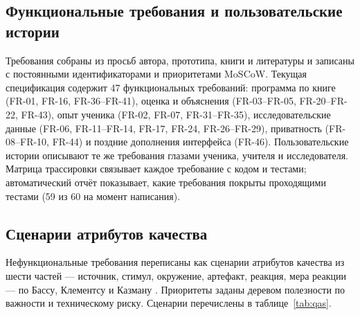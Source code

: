\subsection{Функциональные требования и пользовательские истории}

Требования собраны из просьб автора, прототипа, книги и литературы и записаны с постоянными
идентификаторами и приоритетами MoSCoW. Текущая спецификация содержит 47 функциональных требований:
программа по книге (FR-01, FR-16, FR-36--FR-41), оценка и объяснения (FR-03--FR-05, FR-20--FR-22, FR-43),
опыт ученика (FR-02, FR-07, FR-31--FR-35), исследовательские данные (FR-06, FR-11--FR-14, FR-17, FR-24,
FR-26--FR-29), приватность (FR-08--FR-10, FR-44) и поздние дополнения интерфейса
(FR-46). Пользовательские истории описывают те же требования
глазами ученика, учителя и исследователя. Матрица трассировки связывает каждое требование с кодом и
тестами; автоматический отчёт показывает, какие требования покрыты проходящими тестами (59 из 60 на момент
написания).

\subsection{Сценарии атрибутов качества}

Нефункциональные требования переписаны как сценарии атрибутов качества из шести частей --- источник,
стимул, окружение, артефакт, реакция, мера реакции --- по Бассу, Клементсу и Казману \cite{SRC-047}.
Приоритеты заданы деревом полезности по важности и техническому риску. Сценарии перечислены в
таблице~\ref{tab:qas}.

